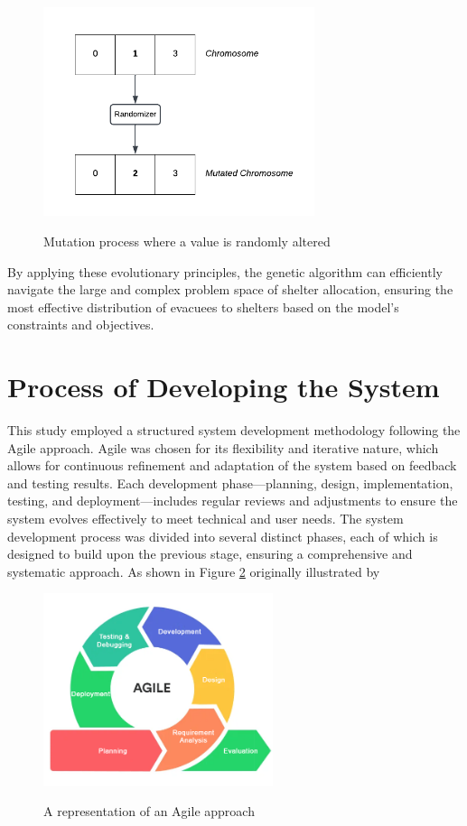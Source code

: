 	\begin{figure}[h!]
		\caption{Mutation process where a value is randomly altered}
		\centering
		\includegraphics[width=300px]{Mutation}
		\label{Mutation}
	\end{figure}
	
	By applying these evolutionary principles, the genetic algorithm can efficiently navigate the large and complex problem space of shelter allocation, ensuring the most effective distribution of evacuees to shelters based on the model’s constraints and objectives.
	

	
	
\section{Process of Developing the System}
	This study employed a structured system development methodology following the Agile approach. Agile was chosen for its flexibility and iterative nature, which allows for continuous refinement and adaptation of the system based on feedback and testing results. Each development phase—planning, design, implementation, testing, and deployment—includes regular reviews and adjustments to ensure the system evolves effectively to meet technical and user needs.
	The system development process was divided into several distinct phases, each of which is designed to build upon the previous stage, ensuring a comprehensive and systematic approach. As shown in Figure \ref{Agile} originally illustrated by \textcite{Jayathilaka2020}

	\begin{figure}[h!]
		\caption{A representation of an Agile approach}
		\centering
		\includegraphics[width=0.6\textwidth]{AGILE}
		\label{Agile}
	\end{figure}

